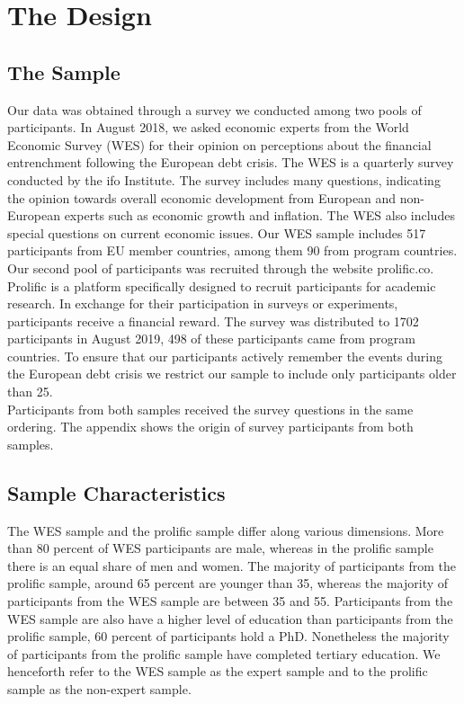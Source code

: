 \section{The Design}
\subsection{The Sample}
Our data was obtained through a survey we conducted among two pools of participants. In August 2018, we asked economic experts from the World Economic Survey (WES) for their opinion on perceptions about the financial entrenchment following the European debt crisis. The WES is a quarterly survey conducted by the ifo Institute. The survey includes many  questions, indicating the opinion towards overall economic development from European and non-European  experts such as economic growth and inflation. The WES also includes special questions on current economic issues. Our WES sample includes 517 participants from EU member countries, among them 90 from program countries.
\\
Our second pool of participants was recruited through the website prolific.co. Prolific is a platform specifically designed to recruit participants for academic research. In exchange for their participation in surveys or experiments, participants receive a financial reward. The survey was distributed to 1702 participants in August 2019, 498 of these participants came from program countries. To ensure that our participants actively remember the events during the European debt crisis we restrict our sample to include only participants older than 25. \\
Participants from both samples received the survey questions in the same ordering. The appendix shows the origin of survey participants from both samples.  
\subsection{Sample Characteristics} 
The WES sample and the prolific sample differ along various dimensions. More than 80 percent of WES participants are male, whereas in the prolific sample there is an equal share of men and women. The majority of participants from the prolific sample, around 65 percent are younger than 35, whereas the majority of participants from the WES sample are between 35 and 55. Participants from the WES sample are also have a higher level of education than participants from the prolific sample, 60 percent of participants hold a PhD. Nonetheless the majority of participants from the prolific sample have completed tertiary education. We henceforth refer to the WES sample as the expert sample and to the prolific sample as the non-expert sample. 
